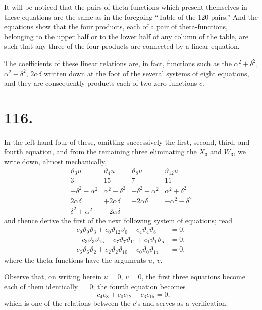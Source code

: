 \documentclass[11pt,a4paper]{article}
\newcommand{\uth}[1]{\vartheta_{#1}}
\begin{document}
It will be noticed that the pairs of theta-functions which present themselves in these equations are the same as in the foregoing ``Table of the 120 pairs.'' And the equations show that the four products, each of a pair of theta-functions, belonging to the upper half or to the lower half of any column of the table, are such that any three of the four products are connected by a linear equation.

The coefficients of these linear relations are, in fact, functions such as the $\alpha^2 + \delta^2$, $\alpha^2 - \delta^2$, $2\alpha\delta$ written down at the foot of the several systems of eight equations, and they are consequently products each of two zero-functions $c$.

\newpage
\section*{116.}
\label{sec:116}

In the left-hand four of these, omitting successively the first, second, third, and fourth equation, and from the remaining three eliminating the $X_3$ and $W_3$, we write down, almost mechanically,
\[
\begin{array}{c|cccc}
\uth{3}u & \uth{4}u & \uth{8}u & \uth{12}u \\
\hline
3 & 15 & 7 & 11 \\
\hline
- \delta^2 - \alpha^2 & \alpha^2 - \delta^2 & -\delta^2 + \alpha^2 & \alpha^2 + \delta^2 \\
2\alpha\delta & +2\alpha\delta & -2\alpha\delta & -\alpha^2 - \delta^2 \\
\delta^2 + \alpha^2 & -2\alpha\delta
\end{array}
\]
and thence derive the first of the next following system of equations; read
\begin{align*}
c_9\uth{9}\uth{3} + c_0\uth{12}\uth{0} + c_4\uth{4}\uth{8} &= 0, \\
-c_3\uth{3}\uth{15} + c_7\uth{7}\uth{11} + c_1\uth{1}\uth{5} &= 0, \\
c_6\uth{6}\uth{2} + c_2\uth{2}\uth{10} + c_0\uth{0}\uth{14} &= 0,
\end{align*}
where the theta-functions have the arguments $u$, $v$.

Observe that, on writing herein $u = 0$, $v = 0$, the first three equations become each of them identically $= 0$; the fourth equation becomes
\[
-c_4c_8 + c_0c_{12} - c_3c_{15} = 0,
\]
which is one of the relations between the $c$'s and serves as a verification.
\end{document}
